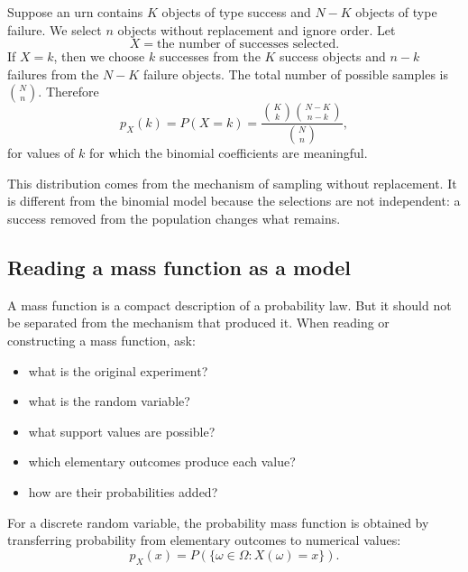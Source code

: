 Suppose an urn contains \(K\) objects of type success and \(N-K\) objects of type
failure. We select \(n\) objects without replacement and ignore order. Let
\[
X=\text{the number of successes selected}.
\]
If \(X=k\), then we choose \(k\) successes from the \(K\) success objects and
\(n-k\) failures from the \(N-K\) failure objects. The total number of possible
samples is \(\binom{N}{n}\). Therefore
\[
p_X(k)=P(X=k)=\frac{\binom{K}{k}\binom{N-K}{n-k}}{\binom{N}{n}},
\]
for values of \(k\) for which the binomial coefficients are meaningful.

This distribution comes from the mechanism of sampling without replacement. It
is different from the binomial model because the selections are not independent:
a success removed from the population changes what remains.

\subsection*{Reading a mass function as a model}

A mass function is a compact description of a probability law. But it should not
be separated from the mechanism that produced it. When reading or constructing a
mass function, ask:
\begin{itemize}
    \item what is the original experiment?
    \item what is the random variable?
    \item what support values are possible?
    \item which elementary outcomes produce each value?
    \item how are their probabilities added?
\end{itemize}

\begin{theorembox}
For a discrete random variable, the probability mass function is obtained by
transferring probability from elementary outcomes to numerical values:
\[
p_X(x)=P(\{\omega\in\Omega:X(\omega)=x\}).
\]
\end{theorembox}
